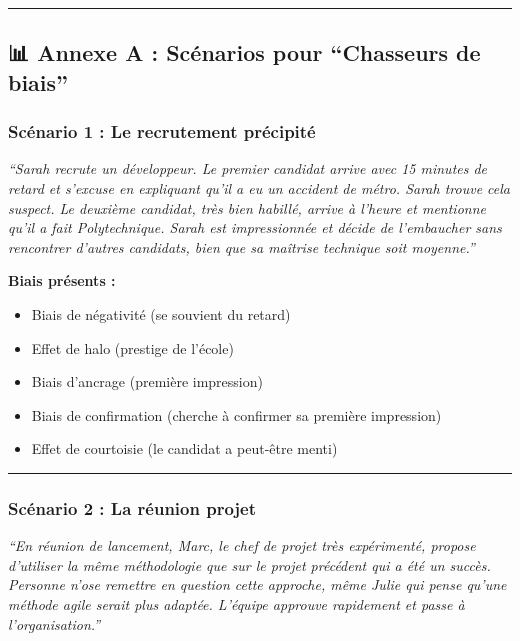 \documentclass[
]{article}
\providecommand{\tightlist}{%
  \setlength{\itemsep}{0pt}\setlength{\parskip}{0pt}}
\begin{document}
\begin{center}\rule{0.5\linewidth}{0.5pt}\end{center}

\subsection{📊 Annexe A : Scénarios pour ``Chasseurs de
biais''}\label{annexe-a-scuxe9narios-pour-chasseurs-de-biais}

\subsubsection{Scénario 1 : Le recrutement
précipité}\label{scuxe9nario-1-le-recrutement-pruxe9cipituxe9}

\emph{``Sarah recrute un développeur. Le premier candidat arrive avec 15
minutes de retard et s'excuse en expliquant qu'il a eu un accident de
métro. Sarah trouve cela suspect. Le deuxième candidat, très bien
habillé, arrive à l'heure et mentionne qu'il a fait Polytechnique. Sarah
est impressionnée et décide de l'embaucher sans rencontrer d'autres
candidats, bien que sa maîtrise technique soit moyenne.''}

\textbf{Biais présents :}

\begin{itemize}
\tightlist
\item
  Biais de négativité (se souvient du retard)
\item
  Effet de halo (prestige de l'école)
\item
  Biais d'ancrage (première impression)
\item
  Biais de confirmation (cherche à confirmer sa première impression)
\item
  Effet de courtoisie (le candidat a peut-être menti)
\end{itemize}

\begin{center}\rule{0.5\linewidth}{0.5pt}\end{center}

\subsubsection{Scénario 2 : La réunion
projet}\label{scuxe9nario-2-la-ruxe9union-projet}

\emph{``En réunion de lancement, Marc, le chef de projet très
expérimenté, propose d'utiliser la même méthodologie que sur le projet
précédent qui a été un succès. Personne n'ose remettre en question cette
approche, même Julie qui pense qu'une méthode agile serait plus adaptée.
L'équipe approuve rapidement et passe à l'organisation.''}
\end{document}
